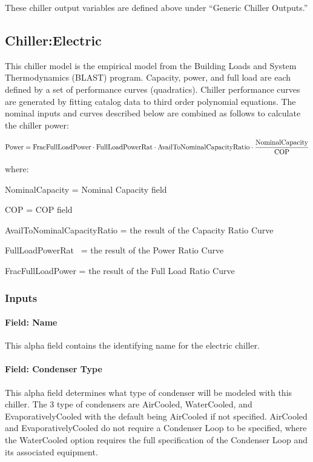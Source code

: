 These chiller output variables are defined above under ``Generic Chiller Outputs.''

\subsection{Chiller:Electric}\label{chillerelectric}

This chiller model is the empirical model from the Building Loads and System Thermodynamics (BLAST) program. Capacity, power, and full load are each defined by a set of performance curves (quadratics). Chiller performance curves are generated by fitting catalog data to third order polynomial equations. The nominal inputs and curves described below are combined as follows to calculate the chiller power:

\begin{equation}
{\rm{Power  =  FracFullLoadPower }}\cdot {\rm{ FullLoadPowerRat }}\cdot {\rm{ AvailToNominalCapacityRatio }}\cdot \frac{{{\rm{NominalCapacity}}}}{{{\rm{COP}}}}
\end{equation}

where:

NominalCapacity = Nominal Capacity field

COP = COP field

AvailToNominalCapacityRatio = the result of the Capacity Ratio Curve

FullLoadPowerRat~ = the result of the Power Ratio Curve

FracFullLoadPower = the result of the Full Load Ratio Curve

\subsubsection{Inputs}\label{inputs-3-026}

\paragraph{Field: Name}\label{field-name-3-023}

This alpha field contains the identifying name for the electric chiller.

\paragraph{Field: Condenser Type}\label{field-condenser-type-1-001}

This alpha field determines what type of condenser will be modeled with this chiller. The 3 type of condensers are AirCooled, WaterCooled, and EvaporativelyCooled with the default being AirCooled if not specified. AirCooled and EvaporativelyCooled do not require a Condenser Loop to be specified, where the WaterCooled option requires the full specification of the Condenser Loop and its associated equipment.

